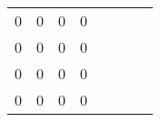 \begin{table}[ht]
\begin{tabular}{rrrlrrrr}
    0      & 0          & 0  & 0  &                                                            &                                                            &                                                            &           \\ \cline{1-4}
    0      & 0          & 0  & 0  &                                                            &                                                            &                                                            &           \\ \cline{1-4}
    0      & 0          & 0  & 0  &                                                            &                                                            &                                                            &           \\ \cline{1-4}
    0      & 0          & 0  & 0  &                                                            &                                                            &                                                            &           \\ \hline
  \end{tabular}
\end{table}
